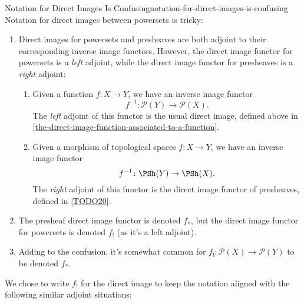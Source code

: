 \begin{warning}{Notation for Direct Images Is Confusing}{notation-for-direct-images-is-confusing}%
    Notation for direct images between powersets is tricky:
    \begin{enumerate}
        \item\label{notation-for-direct-images-is-confusing-1}Direct images for powersets and presheaves are both adjoint to their corresponding inverse image functors. However, the direct image functor for powersets is a \emph{left} adjoint, while the direct image functor for presheaves is a \emph{right} adjoint:
            \begin{enumerate}
                \item\label{notation-for-direct-images-is-confusing-1a}Given a function $f\colon X\to Y$, we have an inverse image functor
                    \[
                        f^{-1}%
                        \colon%
                        \mathcal{P}(Y)%
                        \to%
                        \mathcal{P}(X).%
                    \]%
                    The \emph{left} adjoint of this functor is the usual direct image, defined above in \cref{the-direct-image-function-associated-to-a-function}.
                \item\label{notation-for-direct-images-is-confusing-1b}Given a morphism of topological spaces $f\colon X\to Y$, we have an inverse image functor
                    \[
                        f^{-1}%
                        \colon%
                        \PSh(Y)%
                        \to%
                        \PSh(X).%
                    \]%
                    The \emph{right} adjoint of this functor is the direct image functor of presheaves, defined in \cref{TODO20}.
            \end{enumerate}
        \item\label{notation-for-direct-images-is-confusing-2}The presheaf direct image functor is denoted $f_{*}$, but the direct image functor for powersets is denoted $f_{!}$ (as it's a left adjoint).
        \item\label{notation-for-direct-images-is-confusing-3}Adding to the confusion, it's somewhat common for $f_{!}\colon\mathcal{P}(X)\to\mathcal{P}(Y)$ to be denoted $f_{*}$.
    \end{enumerate}
    We chose to write $f_{!}$ for the direct image to keep the notation aligned with the following similar adjoint situations:
    \begingroup%
    \setlength\cellspacetoplimit{3pt}

\end{warning}
